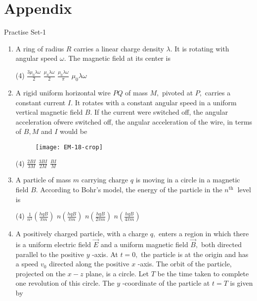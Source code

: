 \chapter{Appendix}
\newpage
\begin{abox}
	Practise Set-1
\end{abox}
\begin{enumerate}[ label=\color{ocre}\textbf{\arabic*.}]
	\item 
	A ring of radius $R$ carries a linear charge density $\lambda .$ It is rotating with angular speed $\omega$. The magnetic field at its center is {}
	\begin{tasks}(4)
		\task[\textbf{a.}]$\frac{3 \mu_{0} \lambda \omega}{2}$
		\task[\textbf{b.}]$\frac{\mu_{0} \lambda \omega}{2}$ 
		\task[\textbf{c.}]$\frac{\mu_{0} \lambda \omega}{\pi}$ 
		\task[\textbf{d.}] $\mu_{0} \lambda \omega$
	\end{tasks}
	\item A rigid uniform horizontal wire $P Q$ of mass $M,$ pivoted at $P,$ carries a constant current $I .$ It rotates with a constant angular speed in a uniform vertical magnetic field $B$. If the current were switched off, the angular acceleration ofwere switched off, the angular acceleration of the wire, in terms of $B, M$ and $I$ would be{}
	\begin{figure}[H]
		\begin{center}
			\texttt{[image: EM-18-crop]}
		\end{center}
	\end{figure}
	\begin{tasks}(4)
		\task[\textbf{b.}]$\frac{2 B I}{3 M}$
		\task[\textbf{c.}] $\frac{3 B I}{2 M}$
		\task[\textbf{d.}] $\frac{B I}{M}$
	\end{tasks}
	\item A particle of mass $m$ carrying charge $q$ is moving in a circle in a magnetic field $B$. According to Bohr's model, the energy of the particle in the $n^{\text {th }}$ level is{}
	\begin{tasks}(4)
		\task[\textbf{a.}]$\frac{1}{n^{2}}\left(\frac{h q B}{\pi m}\right)$
		\task[\textbf{b.}] $n\left(\frac{h q B}{\pi m}\right)$
		\task[\textbf{c.}]  $n\left(\frac{h q B}{2 \pi m}\right)$
		\task[\textbf{d.}]  $n\left(\frac{h q B}{4 \pi m}\right)$
	\end{tasks}
	\item A positively charged particle, with a charge $q,$ enters a region in which there is a uniform electric field $\vec{E}$ and a uniform magnetic field $\vec{B},$ both directed parallel to the positive $y$ -axis. At $t=0,$ the particle is at the origin and has a speed $v_{0}$ directed along the positive $x$ -axis. The orbit of the particle, projected on the $x-z$ plane, is a circle. Let $T$ be the time taken to complete one revolution of this circle. The $y$ -coordinate of the particle at $t=T$ is given by{}

\end{enumerate}
